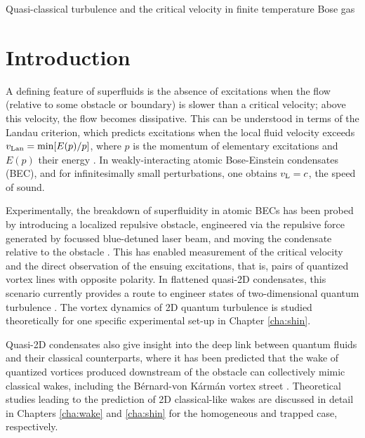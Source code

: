 \begin{chapter}{\label{cha:nonequib}Quasi-classical turbulence and the critical velocity in finite temperature Bose gas}
\section{Introduction}
A defining feature of superfluids is the absence of excitations when the flow (relative to some obstacle or boundary) is slower than a critical velocity; above this velocity, the flow becomes dissipative.  This can be understood in terms of the Landau criterion, which predicts excitations when the local fluid velocity exceeds $v_{\rm Lan} = \textrm{min} [E(p)/p]$, where $p$ is the momentum of elementary excitations and $E(p)$ their energy \cite{NozieresPines}. In weakly-interacting atomic Bose-Einstein condensates (BEC), and for infinitesimally small perturbations, one obtains $v_{\rm L} = c$, the speed of sound.

Experimentally, the breakdown of superfluidity in atomic BECs has been probed by introducing a localized repulsive obstacle, engineered via the repulsive force generated by focussed blue-detuned laser beam, and moving the condensate relative to the obstacle \cite{Neely,kwon_moon_14,kwon_2015a,kwon_2015b,Raman,Onofrio,Inouye,desbuquois_2012}. This has enabled measurement of the critical velocity and the direct observation of the ensuing excitations, that is, pairs of quantized vortex lines with opposite polarity.
In flattened quasi-2D condensates, this scenario currently provides a route to engineer states of two-dimensional quantum turbulence \cite{Neely,kwon_moon_14}. The vortex dynamics of 2D quantum turbulence is studied theoretically for one specific experimental set-up \cite{kwon_moon_14} in Chapter \ref{cha:shin}.

Quasi-2D condensates also give insight into the deep link between quantum fluids and their classical counterparts, where it has been predicted that the wake of quantized
vortices produced downstream of the obstacle can collectively mimic classical wakes, including the B{\' e}rnard-von K{\'a}rm{\' a}n vortex street
\cite{saito10,stagg_parker_14,reeves_2015}. Theoretical studies leading to the prediction of 2D classical-like wakes are discussed in detail in Chapters \ref{cha:wake} and \ref{cha:shin} for the homogeneous and trapped case, respectively.


\end{chapter}
